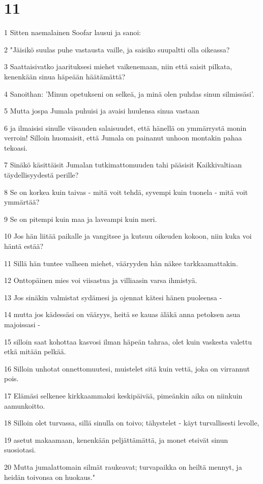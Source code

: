 \chapter{11}

\par 1 Sitten naemalainen Soofar lausui ja sanoi:
\par 2 "Jäisikö suulas puhe vastausta vaille, ja saisiko suupaltti olla oikeassa?
\par 3 Saattaisivatko jaarituksesi miehet vaikenemaan, niin että saisit pilkata, kenenkään sinua häpeään häätämättä?
\par 4 Sanoithan: 'Minun opetukseni on selkeä, ja minä olen puhdas sinun silmissäsi'.
\par 5 Mutta jospa Jumala puhuisi ja avaisi huulensa sinua vastaan
\par 6 ja ilmaisisi sinulle viisauden salaisuudet, että hänellä on ymmärrystä monin verroin! Silloin huomaisit, että Jumala on painanut unhoon montakin pahaa tekoasi.
\par 7 Sinäkö käsittäisit Jumalan tutkimattomuuden tahi pääsisit Kaikkivaltiaan täydellisyydestä perille?
\par 8 Se on korkea kuin taivas - mitä voit tehdä, syvempi kuin tuonela - mitä voit ymmärtää?
\par 9 Se on pitempi kuin maa ja laveampi kuin meri.
\par 10 Jos hän liitää paikalle ja vangitsee ja kutsuu oikeuden kokoon, niin kuka voi häntä estää?
\par 11 Sillä hän tuntee valheen miehet, vääryyden hän näkee tarkkaamattakin.
\par 12 Onttopäinen mies voi viisastua ja villiaasin varsa ihmistyä.
\par 13 Jos sinäkin valmistat sydämesi ja ojennat kätesi hänen puoleensa -
\par 14 mutta jos kädessäsi on vääryys, heitä se kauas äläkä anna petoksen asua majoissasi -
\par 15 silloin saat kohottaa kasvosi ilman häpeän tahraa, olet kuin vaskesta valettu etkä mitään pelkää.
\par 16 Silloin unhotat onnettomuutesi, muistelet sitä kuin vettä, joka on virrannut pois.
\par 17 Elämäsi selkenee kirkkaammaksi keskipäivää, pimeänkin aika on niinkuin aamunkoitto.
\par 18 Silloin olet turvassa, sillä sinulla on toivo; tähystelet - käyt turvallisesti levolle,
\par 19 asetut makaamaan, kenenkään peljättämättä, ja monet etsivät sinun suosiotasi.
\par 20 Mutta jumalattomain silmät raukeavat; turvapaikka on heiltä mennyt, ja heidän toivonsa on huokaus."

